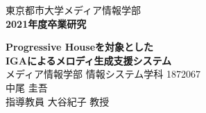 \documentclass[fleqn,11pt]{jreport}
\begin{document}
\baselineskip 21.5pt

\begin{titlepage}
	\vspace*{3cm}
	\begin{center}
		{\Large\gt 東京都市大学メディア情報学部}\\
		\vspace*{0.5cm}
		{\Large\bf 2021年度卒業研究}\\
		\vspace{1.5cm}

		{\huge\bf Progressive Houseを対象とした}\\
		\vspace{0.5cm}
		{\huge\bf IGAによるメロディ生成支援システム}\\

		\vspace{9cm}
		{\Large メディア情報学部 情報システム学科 1872067}\\
		{\Large 中尾 圭吾}\\
		\vspace*{0.5cm}
		{\Large 指導教員 大谷紀子 教授}\\
	\end{center}
\end{titlepage}

\tableofcontents
\cleardoublepage












%


\appendix


\end{document}
